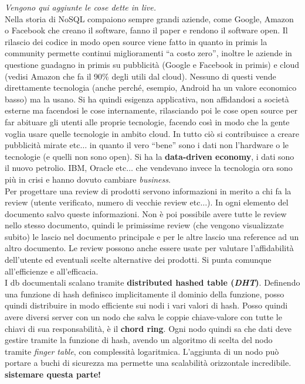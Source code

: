 \documentclass[a4paper,12pt, oneside]{book}
\begin{document}
\begin{shaded}
  \noindent
  \textit{Vengono qui aggiunte le cose dette in live.}\\
  Nella storia di NoSQL compaiono sempre grandi aziende, come Google, Amazon o
  Facebook che creano il software, fanno il paper e rendono il software open. Il
  rilascio dei codice in modo open source viene fatto in quanto in primis la
  community permette continui miglioramenti ``a costo zero'', inoltre le aziende
  in questione guadagno in primis su pubblicità (Google e Facebook in primis) e
  cloud (vedisi Amazon che fa il 90\% degli utili dal cloud). Nessuno di questi
  vende direttamente tecnologia (anche perché, esempio, Android ha un valore
  economico basso) ma la usano. Si ha quindi esigenza applicativa, non
  affidandosi a società esterne ma facendosi le cose internamente, rilasciando
  poi le cose open source per far abituare gli utenti alle proprie tecnologie,
  facendo così in modo che la gente voglia usare quelle tecnologie in ambito
  cloud. In tutto ciò si contribuisce a creare pubblicità mirate etc$\ldots$ in
  quanto il vero ``bene'' sono i dati non l'hardware o le tecnologie (e quelli
  non sono open). Si ha la \textbf{data-driven economy}, i dati sono il nuovo
  petrolio. IBM, Oracle etc$\ldots$ che vendevano invece la tecnologia ora sono
  più in crisi e hanno dovuto cambiare \textit{business}.\\
  Per progettare una review di prodotti servono informazioni in merito a chi fa
  la review (utente verificato, numero di vecchie review etc$\ldots$). In ogni
  elemento del documento salvo queste informazioni. Non è poi possibile avere
  tutte le review nello stesso documento, quindi le primissime review (che
  vengono visualizzate subito) le lascio
  nel documento principale e per le altre lascio una reference ad un altro
  documento. Le review possono anche essere usate per valutare l'affidabilità
  dell'utente ed eventuali scelte alternative dei prodotti. Si punta comunque
  all'efficienze e all'efficacia.\\
  I db documentali scalano tramite \textbf{distributed hashed table
    (\textit{DHT})}. Definendo una funzione di hash definisco implicitamente il
  dominio della funzione, posso quindi distribuire in modo efficiente sui nodi i
  vari valori di hash. Posso quindi avere diversi server con un nodo che salva
  le coppie chiave-valore con tutte le chiavi di sua responsabilità, è il
  \textbf{chord ring}. Ogni nodo quindi sa che dati deve gestire tramite la
  funzione di hash, avendo un 
  algoritmo di scelta del nodo tramite \textit{finger table}, con complessità
  logaritmica. L'aggiunta di un nodo può portare a buchi di sicurezza ma
  permette una scalabilità orizzontale incredibile.\\
  \textbf{sistemare questa parte!}
\end{shaded}
\end{document}
